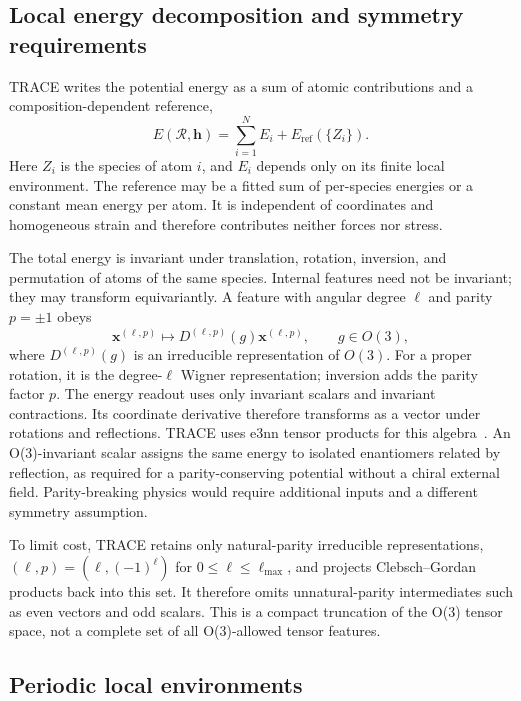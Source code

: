 \documentclass[aps,prx,preprint,notitlepage,superscriptaddress,nofootinbib,floatfix]{revtex4-2}
\newcommand{\vect}[1]{\bm{#1}}
\begin{document}
\subsection{Local energy decomposition and symmetry requirements}

TRACE writes the potential energy as a sum of atomic contributions and a composition-dependent reference,
\begin{equation}
 E(\mathcal R,\vect h)=\sum_{i=1}^{N}E_i+E_{\mathrm{ref}}(\{Z_i\}).
 \label{eq:energy-decomp}
\end{equation}
Here $Z_i$ is the species of atom $i$, and $E_i$ depends only
on its finite local environment. The reference may be a fitted sum of
per-species energies or a constant mean energy per atom. It is independent of coordinates and homogeneous strain and therefore contributes neither forces nor stress.

The total energy is invariant under translation, rotation, inversion, and permutation of atoms of the same species. Internal features need not be invariant; they may transform equivariantly. A feature with angular degree $\ell$ and parity $p=\pm1$ obeys
\begin{equation}
 \vect x^{(\ell,p)}\mapsto D^{(\ell,p)}(g)\vect x^{(\ell,p)},\qquad g\in O(3),
 \label{eq:irrep-transform}
\end{equation}
where $D^{(\ell,p)}(g)$ is an irreducible representation of
$O(3)$. For a proper rotation, it is the degree-$\ell$ Wigner representation; inversion adds the parity factor $p$. The energy readout uses only invariant scalars and invariant contractions. Its coordinate derivative therefore transforms as a vector under rotations and reflections. TRACE uses e3nn tensor products for this algebra~\cite{geiger2022}. An O(3)-invariant scalar assigns the same energy to isolated enantiomers related by reflection, as required for a parity-conserving potential without a chiral external field. Parity-breaking physics would require additional inputs and a different symmetry assumption.

To limit cost, TRACE retains only natural-parity irreducible
representations, $(\ell,p)=(\ell,(-1)^\ell)$ for
$0\leq\ell\leq\ell_{\max}$, and projects Clebsch--Gordan products back into this set. It therefore omits unnatural-parity intermediates such as even vectors and odd scalars. This is a compact truncation of the O(3) tensor space, not a complete set of all O(3)-allowed tensor features.

\subsection{Periodic local environments}
\end{document}
